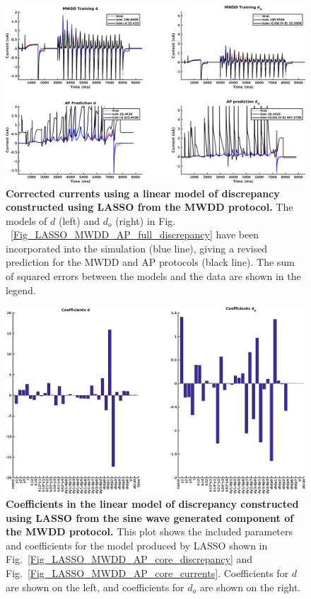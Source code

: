 \documentclass[11pt,a4paper,oneside]{article}
\begin{document}
\begin{figure}[hb]
\begin{center}
\includegraphics[scale=0.42]{Figures/LASSO_MWDD_AP_full_currents.png}
\caption{\textbf{Corrected currents using a linear model of discrepancy constructed using LASSO from the MWDD protocol.} The models of $d$ (left) and $d_o$ (right) in Fig. ~\ref{Fig_LASSO_MWDD_AP_full_discrepancy} have been incorporated into the simulation (blue line), giving a revised prediction for the MWDD and AP protocols (black line). The sum of squared errors between the models and the data are shown in the legend.}
\label{Fig_LASSO_MWDD_AP_full_currents}
\end{center}
\end{figure}

\clearpage

\begin{figure}[t]
\begin{center}
\includegraphics[scale=0.42]{Figures/LASSO_MWDD_AP_full_coefficients.png}
\caption{\textbf{Coefficients in the linear model of discrepancy constructed using LASSO from the sine wave generated component of the MWDD protocol.} This plot shows the included parameters and coefficients for the model produced by LASSO shown in Fig.~\ref{Fig_LASSO_MWDD_AP_core_discrepancy} and Fig.~\ref{Fig_LASSO_MWDD_AP_core_currents}. Coefficients for $d$ are shown on the left, and coefficients for $d_o$ are shown on the right.} 
\label{Fig_LASSO_MWDD_AP_core_coefficients}
\end{center}
\end{figure}
\end{document}

